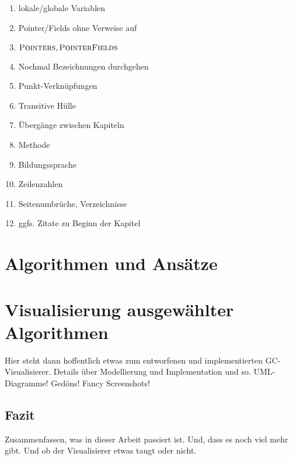 
\listfiles


\listoftodos

\begin{enumerate}
	\item lokale/globale Variablen
	\item Pointer/Fields ohne Verweise auf \Roots
	\item $\textsc{Pointers}, \textsc{PointerFields}$
	\item Nochmal Bezeichnungen durchgehen
	\item Punkt-Verknüpfungen
	\item Transitive Hülle
	\item Übergänge zwischen Kapiteln
	\item Methode
	\item Bildungssprache
	\item Zeilenzahlen
	\item Seitenumbrüche, Verzeichnisse
	\item ggfs. Zitate zu Beginn der Kapitel
\end{enumerate}



\cleardoublepage

\setcounter{page}{1}
\pagestyle{maincontentstyle}


\part{Algorithmen und Ansätze}






\part{Visualisierung ausgewählter Algorithmen}
Hier steht dann hoffentlich etwas zum entworfenen und implementierten GC-Visualisierer. Details über Modellierung und Implementation und so. UML-Diagramme! Gedöns! Fancy Screenshots!
%
\cleardoublepage

\chapter{Fazit}
Zusammenfassen, was in dieser Arbeit passiert ist.
Und, dass es noch viel mehr gibt.
Und ob der Visualisierer etwas taugt oder nicht.





